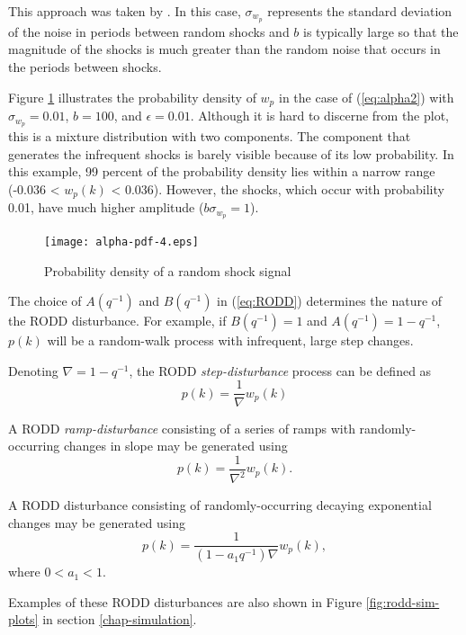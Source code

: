 This approach was taken by \cite{robertson_detection_1995}. In this case, $\sigma_{w_p}$ represents the standard deviation of the noise in periods between random shocks and $b$ is typically large so that the magnitude of the shocks is much greater than the random noise that occurs in the periods between shocks.

Figure \ref{fig:alpha-pdf} illustrates the probability density of $w_p$ in the case of (\ref{eq:alpha2}) with $\sigma_{w_p}=0.01$, $b=100$, and $\epsilon=0.01$. Although it is hard to discerne from the plot, this is a mixture distribution with two components. The component that generates the infrequent shocks is barely visible because of its low probability. In this example, 99 percent of the probability density lies within a narrow range (-0.036 < $w_p(k)$ < 0.036). However, the shocks, which occur with probability 0.01, have much higher amplitude ($b\sigma_{w_p}=1$).

\begin{figure}[htp]
	\centering
	\texttt{[image: alpha-pdf-4.eps]}
	\caption{Probability density of a random shock signal}
	\label{fig:alpha-pdf}
\end{figure}

The choice of $A(q^{-1})$ and $B(q^{-1})$ in (\ref{eq:RODD}) determines the nature of the RODD disturbance. For example, if $B(q^{-1})=1$ and $A(q^{-1})=1-q^{-1}$, $p(k)$ will be a random-walk process with infrequent, large step changes.

Denoting $\nabla=1-q^{-1}$, the RODD \textit{step-disturbance} process can be defined as
\begin{equation} \label{eq:RODD-step}
	p(k)= \frac{1}{\nabla}w_p(k)
\end{equation}

A RODD \textit{ramp-disturbance} consisting of a series of ramps with randomly-occurring changes in slope may be generated using
\begin{equation} \label{eq:RODD-ramp}
	p(k)= \frac{1}{\nabla^2}w_p(k).
\end{equation}

A RODD disturbance consisting of randomly-occurring decaying exponential changes may be generated using
\begin{equation} \label{eq:RODD-exp}
	p(k)= \frac{1}{(1-a_1q^{-1})\nabla}w_p(k),
\end{equation}
where  $0<a_1<1$.

Examples of these RODD disturbances are also shown in Figure \ref{fig:rodd-sim-plots} in section \ref{chap-simulation}.

